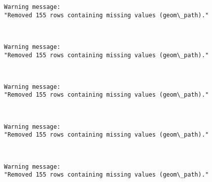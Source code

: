 \documentclass[11pt]{article}
\begin{document}
    \begin{Verbatim}[commandchars=\\\{\}]
Warning message:
"Removed 155 rows containing missing values (geom\_path)."
    \end{Verbatim}

    \begin{center}
    \end{center}
    { \hspace*{\fill} \\}
    
    \begin{Verbatim}[commandchars=\\\{\}]
Warning message:
"Removed 155 rows containing missing values (geom\_path)."
    \end{Verbatim}

    \begin{center}
    \end{center}
    { \hspace*{\fill} \\}
    
    \begin{Verbatim}[commandchars=\\\{\}]
Warning message:
"Removed 155 rows containing missing values (geom\_path)."
    \end{Verbatim}

    \begin{center}
    \end{center}
    { \hspace*{\fill} \\}
    
    \begin{Verbatim}[commandchars=\\\{\}]
Warning message:
"Removed 155 rows containing missing values (geom\_path)."
    \end{Verbatim}

    \begin{center}
    \end{center}
    { \hspace*{\fill} \\}
    
    \begin{Verbatim}[commandchars=\\\{\}]
Warning message:
"Removed 155 rows containing missing values (geom\_path)."
    \end{Verbatim}
\end{document}
